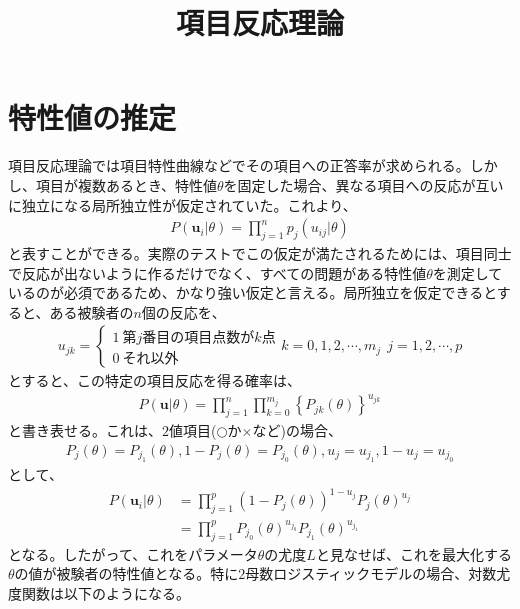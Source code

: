 \documentclass[12pt]{jarticle}
\title{項目反応理論}
\begin{document}
\maketitle
\section{特性値の推定}
項目反応理論では項目特性曲線などでその項目への正答率が求められる。しかし、項目が複数あるとき、特性値$\theta$を固定した場合、異なる項目への反応が互いに独立になる局所独立性が仮定されていた。これより、
\begin{eqnarray}
  \label{00}
  \displaystyle P(\boldsymbol{u}_{i}|\theta) =\prod_{j = 1}^{n} p_{j}(u_{ij}|\theta)
\end{eqnarray}
と表すことができる。実際のテストでこの仮定が満たされるためには、項目同士で反応が出ないように作るだけでなく、すべての問題がある特性値$\theta$を測定しているのが必須であるため、かなり強い仮定と言える。局所独立を仮定できるとすると、ある被験者の$n$個の反応を、
\begin{eqnarray}
  \label{01}
  \displaystyle u_{jk} =\left\{\begin{array}{l}1 \ 第j番目の項目点数がk点\\ 0 \ それ以外\end{array}\right. k = 0,1,2,\cdots,m_{j} \ \ j = 1,2,\cdots,p
\end{eqnarray}
とすると、この特定の項目反応を得る確率は、
\begin{eqnarray}
  \label{02}
  \displaystyle P(\boldsymbol{u}|\theta) = \prod_{j = 1}^{n} \prod_{k = 0}^{m_j} \left\{P_{jk}(\theta)\right\}^{u_{jk}}
\end{eqnarray}
と書き表せる。これは、$2$値項目($\bigcirc$か$\times$など)の場合、
\begin{eqnarray}
  \label{03}
  \displaystyle P_{j}(\theta) = P_{j_1}(\theta),1 - P_j(\theta) = P_{j_0}(\theta),u_j = u_{j_1},1 - u_j = u_{j_0}
\end{eqnarray}
として、
\begin{align}
  \label{04}
  \displaystyle P(\boldsymbol{u}_{i}|\theta) &= \prod_{j = 1}^{p} (1 - P_j(\theta))^{1 - u_j}P_j(\theta)^{u_j}\\
  &=\prod_{j = 1}^{p} P_{j_0}(\theta)^{u_{j_0}}P_{j_1}(\theta)^{u_{j_1}}
\end{align}
となる。したがって、これをパラメータ$\theta$の尤度$L$と見なせば、これを最大化する$\theta$の値が被験者の特性値となる。特に$2$母数ロジスティックモデルの場合、対数尤度関数は以下のようになる。
\end{document}
